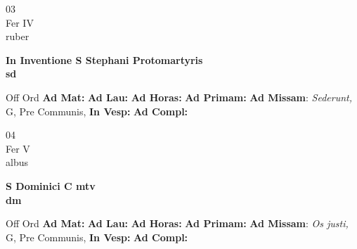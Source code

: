 \documentclass[10pt, openany]{book}
\begin{document}
        \begin{center}
            \begin{minipage}{3.5in}
                \vspace{2em}
                \begin{minipage}{0.5in}
                    {\Huge 03} \\
                    {\normalsize Fer IV} \\
                    {\normalsize ruber}
                \end{minipage}
                \begin{minipage}{3.0in}
                    \textbf{ \large In Inventione S Stephani Protomartyris \\
                    \textnormal{\normalsize sd}} \\ 
                \end{minipage}
                \begin{justify}Off Ord
                    \textbf{Ad Mat: }
                    \textbf{Ad Lau: }
                    \textbf{Ad Horas: }
                    \textbf{Ad Primam: }\textbf{Ad Missam}: \textit{Sederunt,} G, Pre Communis,  
                    \textbf{In Vesp: }
                    \textbf{Ad Compl: }
                \end{justify}
            \end{minipage}
        \end{center}
    
        \begin{center}
            \begin{minipage}{3.5in}
                \vspace{2em}
                \begin{minipage}{0.5in}
                    {\Huge 04} \\
                    {\normalsize Fer V} \\
                    {\normalsize albus}
                \end{minipage}
                \begin{minipage}{3.0in}
                    \textbf{ \large S Dominici C mtv \\
                    \textnormal{\normalsize dm}} \\ 
                \end{minipage}
                \begin{justify}Off Ord
                    \textbf{Ad Mat: }
                    \textbf{Ad Lau: }
                    \textbf{Ad Horas: }
                    \textbf{Ad Primam: }\textbf{Ad Missam}: \textit{Os justi,} G, Pre Communis,  
                    \textbf{In Vesp: }
                    \textbf{Ad Compl: }
                \end{justify}
            \end{minipage}
        \end{center}
    
\end{document}
